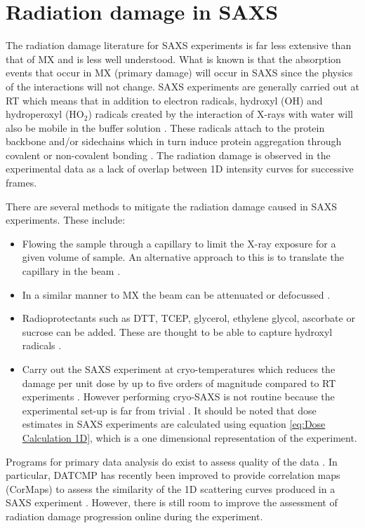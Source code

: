 \section{Radiation damage in SAXS}
\label{sec:Radiation damage in SAXS}
    The radiation damage literature for SAXS experiments is far less extensive than that of MX and is less well understood.
    What is known is that the absorption events that occur in MX (primary damage) will occur in SAXS since the physics of the interactions will not change.
    SAXS experiments are generally carried out at RT which means that in addition to electron radicals, hydroxyl (OH) and hydroperoxyl (HO$_2$) radicals created by the interaction of X-rays with water will also be mobile in the buffer solution \cite{jeffries2015limiting,garrison1987reaction}.
    These radicals attach to the protein backbone and/or sidechains which in turn induce protein aggregation through covalent or non-covalent bonding \cite{kuwamoto2004radiation}.
    The radiation damage is observed in the experimental data as a lack of overlap between 1D intensity curves for successive frames.

    There are several methods to mitigate the radiation damage caused in SAXS experiments. These include:
    \begin{itemize}
        \item Flowing the sample through a capillary to limit the X-ray exposure for a given volume of sample. An alternative approach to this is to translate the capillary in the beam \cite{jeffries2015limiting}.
        \item In a similar manner to MX the beam can be attenuated or defocussed \cite{jeffries2015limiting}.
        \item Radioprotectants such as DTT, TCEP, glycerol, ethylene glycol, ascorbate or sucrose can be added. These are thought to be able to capture hydroxyl radicals \cite{grishaev2012sample}.
        \item Carry out the SAXS experiment at cryo-temperatures which reduces the damage per unit dose by up to five orders of magnitude compared to RT experiments \cite{meisburger2013breaking}. However performing cryo-SAXS is not routine because the experimental set-up is far from trivial \cite{jeffries2015limiting}. It should be noted that dose estimates in SAXS experiments are calculated using equation \ref{eq:Dose Calculation 1D}, which is a one dimensional representation of the experiment.
    \end{itemize}

    Programs for primary data analysis do exist to assess quality of the data \cite{petoukhov2012new}. In particular, DATCMP has recently been improved to provide correlation maps (CorMaps) to assess the similarity of the 1D scattering curves produced in a SAXS experiment \cite{franke2015correlation}. However, there is still room to improve the assessment of radiation damage progression online during the experiment.
